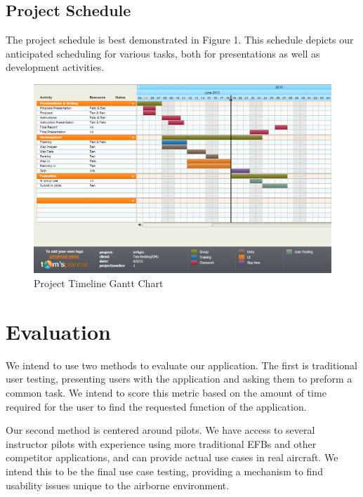 \documentclass[10pt,a4paper]{article}
\begin{document}
\subsection{Project Schedule}
The project schedule is best demonstrated in Figure 1. This schedule depicts our anticipated scheduling for various tasks, both for presentations as well as development activities.
\begin{figure}
\includegraphics[scale=.4]{gantt}
\caption{Project Timeline Gantt Chart}
\end{figure}
\section{Evaluation}
We intend to use two methods to evaluate our application. The first is traditional user testing, presenting users with the application and asking them to preform a common task. We intend to score this metric based on the amount of time required for the user to find the requested function of the application.

Our second method is centered around pilots. We have access to several instructor pilots with experience using more traditional EFBs and other competitor applications, and can provide actual use cases in real aircraft. We intend this to be the final use case testing, providing a mechanism to find usability issues unique to the airborne environment.
\end{document}

